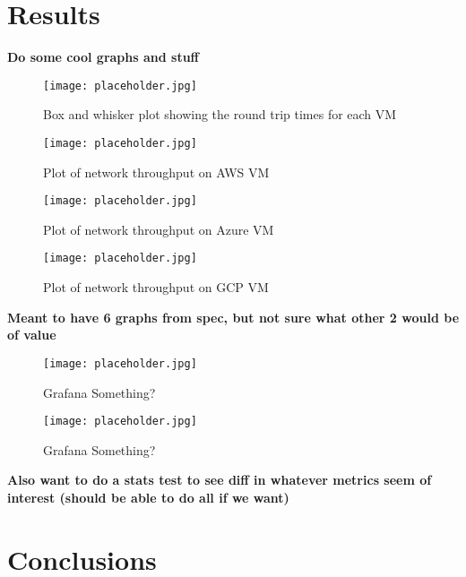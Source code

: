 \documentclass[11pt,a4paper]{article}
\begin{document}
\section*{Results}
\textbf{Do some cool graphs and stuff}

\begin{figure}
\texttt{[image: placeholder.jpg]}
\caption{Box and whisker plot showing the round trip times for each VM}
\end{figure}

\begin{figure}
\texttt{[image: placeholder.jpg]}
\caption{Plot of network throughput on AWS VM}
\end{figure}

\begin{figure}
\texttt{[image: placeholder.jpg]}
\caption{Plot of network throughput on Azure VM}
\end{figure}

\begin{figure}
\texttt{[image: placeholder.jpg]}
\caption{Plot of network throughput on GCP VM}
\end{figure}

\textbf{Meant to have 6 graphs from spec, but not sure what other 2 would be of value}

\begin{figure}
\texttt{[image: placeholder.jpg]}
\caption{Grafana Something?}
\end{figure}

\begin{figure}
\texttt{[image: placeholder.jpg]}
\caption{Grafana Something?}
\end{figure}

\textbf{Also want to do a stats test to see diff in whatever metrics seem of interest (should be able to do all if we want)}

\section*{Conclusions}
\end{document}
